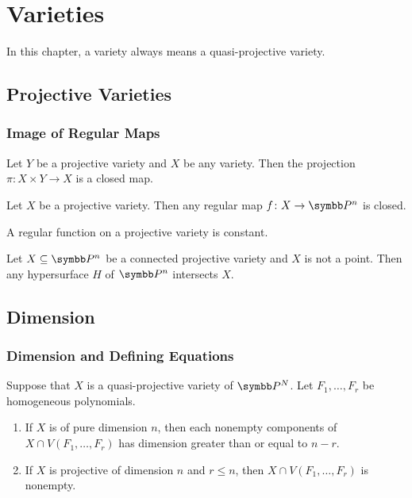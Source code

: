 
\chapter{Varieties}

In this chapter, a variety always means a quasi-projective variety.

\section{Projective Varieties}

\subsection{Image of Regular Maps}

\begin{theorem}
  Let $Y$ be a projective variety and $X$ be any variety. Then the projection  $\pi\colon X\times Y\to X$ is a closed map.
\end{theorem}

\begin{corollary}
  Let $X$ be a projective variety. Then any regular map $f\colon X\to \PP^n$ is closed.
\end{corollary}

\begin{corollary}
  A regular function on a projective variety is constant.
\end{corollary}

\begin{corollary}
  Let $X\subseteq \PP^n$ be a connected projective variety and $X$ is not a point. Then any hypersurface $H$ of $\PP^n$ intersects $X$.
\end{corollary}

\section{Dimension}

\subsection{Dimension and Defining Equations}

\begin{theorem}
  Suppose that $X$ is a quasi-projective variety of $\PP^N$. Let $F_1, \dotsc, F_r$ be homogeneous polynomials.
  \begin{enumerate}
    \item If $X$ is of pure dimension $n$, then each nonempty components of $X\cap V(F_1, \dotsc, F_r)$ has dimension greater than or equal to $n-r$.
    \item If $X$ is projective of dimension $n$ and $r\leq n$, then $X\cap V(F_1, \dotsc, F_r)$ is nonempty.
  \end{enumerate}
\end{theorem}


